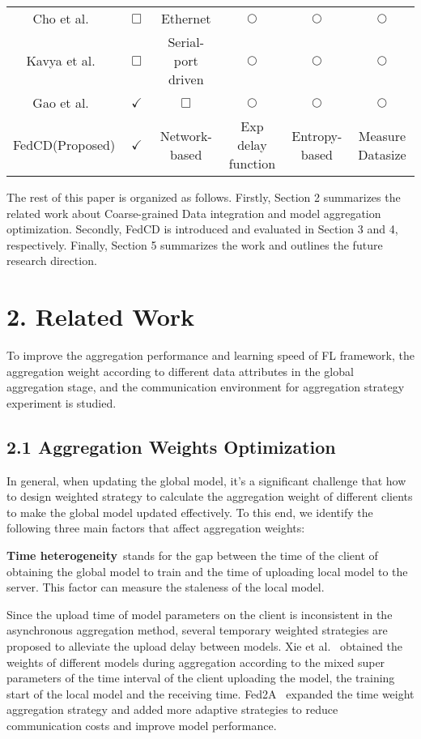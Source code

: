 \documentclass[twoside,twocolumn]{article}
\begin{document}
\begin{table*}
{\begin{tabular}{ c | c  c | c  c  c }
    Cho et al.~\cite{cho2021personalized}  & $\Box$  & Ethernet & $\bigcirc$ & $\bigcirc$ &  $\bigcirc$ \\
    Kavya et al.~\cite{kopparapu2022tinyfedtl}  & $\Box$  & Serial-port driven & $\bigcirc$ & $\bigcirc$ &  $\bigcirc$ \\
    Gao et al.~\cite{gao2021fedim}  & $\checkmark$  & $\Box$ & $\bigcirc$ & $\bigcirc$ &  $\bigcirc$ \\
    FedCD(Proposed) & $\checkmark$ & Network-based & Exp delay function &  Entropy-based & Measure Datasize \\
    \hline
  \end{tabular}}
\end{table*}
	
	The rest of this paper is organized as follows. Firstly, Section 2 summarizes the related work about Coarse-grained Data integration and model aggregation optimization. Secondly, FedCD is introduced and evaluated in Section 3 and 4, respectively. Finally, Section 5 summarizes the work and outlines the future research direction.

\section{2. Related Work}
	To improve the aggregation performance and learning speed of FL framework, the aggregation weight according to different data attributes in the global aggregation stage, and the communication environment for aggregation strategy experiment is studied.

\subsection{2.1 Aggregation Weights Optimization}
	In general, when updating the global model, it’s a significant challenge that how to design weighted strategy to calculate the aggregation weight of different clients to make the global model updated effectively. To this end, we identify the following three main factors that affect aggregation weights:
	
	\textbf{Time heterogeneity}\ stands for the gap between the time of the client of obtaining the global model to train and the time of uploading local model to the server. This factor can measure the staleness of the local model.
	
	Since the upload time of model parameters on the client is inconsistent in the asynchronous aggregation method, several temporary weighted strategies are proposed to alleviate the upload delay between models. Xie et al.~\cite{xie2019asynchronous} obtained the weights of different models during aggregation according to the mixed super parameters of the time interval of the client uploading the model, the training start of the local model and the receiving time. Fed2A~\cite{liu2022fed2a} expanded the time weight aggregation strategy and added more adaptive strategies to reduce communication costs and improve model performance.
\end{document}
